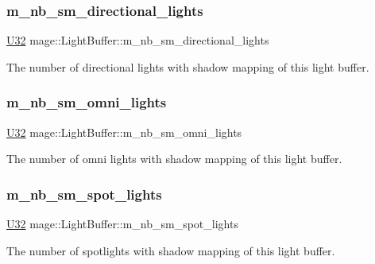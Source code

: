 \subsubsection{\texorpdfstring{m\+\_\+nb\+\_\+sm\+\_\+directional\+\_\+lights}{m\_nb\_sm\_directional\_lights}}
{\footnotesize\ttfamily \hyperlink{namespacemage_a41c104c036fba3756a74e19f793eeaa1}{U32} mage\+::\+Light\+Buffer\+::m\+\_\+nb\+\_\+sm\+\_\+directional\+\_\+lights}

The number of directional lights with shadow mapping of this light buffer. \hypertarget{structmage_1_1_light_buffer_afef9d26eab5ebc74272c23b208f1ba0a}{}\label{structmage_1_1_light_buffer_afef9d26eab5ebc74272c23b208f1ba0a} 
\subsubsection{\texorpdfstring{m\+\_\+nb\+\_\+sm\+\_\+omni\+\_\+lights}{m\_nb\_sm\_omni\_lights}}
{\footnotesize\ttfamily \hyperlink{namespacemage_a41c104c036fba3756a74e19f793eeaa1}{U32} mage\+::\+Light\+Buffer\+::m\+\_\+nb\+\_\+sm\+\_\+omni\+\_\+lights}

The number of omni lights with shadow mapping of this light buffer. \hypertarget{structmage_1_1_light_buffer_a12ef0995fa34d6d132402ff5ab651b9b}{}\label{structmage_1_1_light_buffer_a12ef0995fa34d6d132402ff5ab651b9b} 
\subsubsection{\texorpdfstring{m\+\_\+nb\+\_\+sm\+\_\+spot\+\_\+lights}{m\_nb\_sm\_spot\_lights}}
{\footnotesize\ttfamily \hyperlink{namespacemage_a41c104c036fba3756a74e19f793eeaa1}{U32} mage\+::\+Light\+Buffer\+::m\+\_\+nb\+\_\+sm\+\_\+spot\+\_\+lights}

The number of spotlights with shadow mapping of this light buffer. \hypertarget{structmage_1_1_light_buffer_a33b37a8de8ebd92ad4911d68e836f79f}{}\label{structmage_1_1_light_buffer_a33b37a8de8ebd92ad4911d68e836f79f} 
